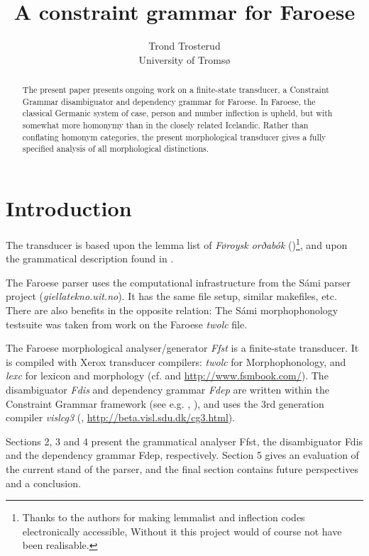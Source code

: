 \documentclass[11pt]{article}
\begin{document}
\title{A constraint grammar for Faroese}
\author{Trond Trosterud \\ 
University of Tromsø}

\date{}

\maketitle{}

\begin{abstract}
The present paper presents ongoing work on a finite-state transducer, a Constraint Grammar disambiguator and dependency grammar for Faroese. In Faroese, the classical Germanic system of case, person and number inflection is upheld, but with somewhat more homonymy than in the closely related Icelandic. Rather than conflating homonym categories, the present morphological transducer gives a fully specified analysis of all morphological distinctions.
\end{abstract}

\section{Introduction} 

The transducer is based upon the lemma list of \emph{Føroysk orðabók} (\cite{Poulsen98})\footnote{Thanks to the authors for making lemmalist and inflection codes electronically accessible, Without it this project would of course not have been realisable.}, and upon the grammatical description found in \cite{Thr04}. 

The Faroese parser uses the computational infrastructure from the Sámi parser project (\textit{giellatekno.uit.no}). It has the same file setup, similar makefiles, etc. There are also benefits in the opposite relation: The Sámi morphophonology testsuite was taken from work on the Faroese \textit{twolc} file. 

The Faroese morphological analyser/generator \textit{Ffst} is a finite-state transducer. It is compiled with Xerox transducer compilers: \textit{twolc} for Morphophonology, and \textit{lexc} for lexicon and morphology (cf. \cite{Beesley03} and \url{http://www.fsmbook.com/}). The disambiguator \textit{Fdis} and dependency grammar \textit{Fdep} are written within the Constraint Grammar framework (see e.g. \cite{Karlsson90}, \cite{Karlsson95}), and uses the 3rd generation compiler \textit{vislcg3} (\cite{Bick00}, \url{http://beta.visl.sdu.dk/cg3.html}).

Sections 2, 3 and 4 present the grammatical analyser Ffst, the disambiguator Fdis and the dependency grammar Fdep, respectively. Section 5 gives an evaluation of the current stand of the parser, and the final section contains future perspectives and a conclusion.
\end{document}
